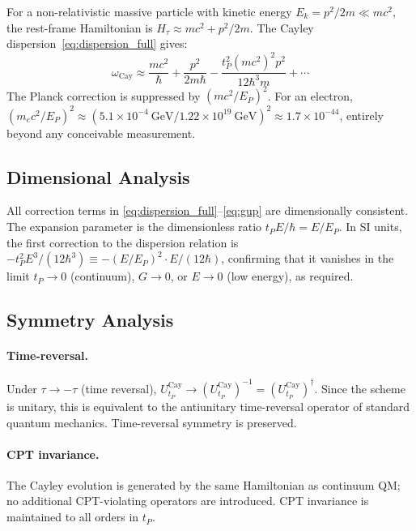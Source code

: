 \documentclass[12pt,a4paper]{article}
\begin{document}
For a non-relativistic massive particle with kinetic energy $E_k = p^2/2m \ll mc^2$,
the rest-frame Hamiltonian is $H_\tau \approx mc^2 + p^2/2m$.  The Cayley
dispersion~\eqref{eq:dispersion_full} gives:
\begin{equation}
  \omega_{\mathrm{Cay}} \approx \frac{mc^2}{\hbar}
  + \frac{p^2}{2m\hbar}
  - \frac{t_P^2 (mc^2)^2 p^2}{12\hbar^3 m} + \cdots
  \label{eq:nr_expansion}
\end{equation}
The Planck correction is suppressed by $(mc^2/E_P)^2$.  For an electron,
$(m_e c^2/E_P)^2 \approx (5.1 \times 10^{-4}~\text{GeV}/1.22 \times 10^{19}~\text{GeV})^2
\approx 1.7 \times 10^{-44}$, entirely beyond any conceivable measurement.

\subsection{Dimensional Analysis}
\label{sec:dimensional}

All correction terms in \eqref{eq:dispersion_full}--\eqref{eq:gup} are dimensionally
consistent.  The expansion parameter is the dimensionless ratio $t_P E/\hbar = E/E_P$.
In SI units, the first correction to the dispersion relation is
$-t_P^2 E^3/(12\hbar^3) \equiv -(E/E_P)^2 \cdot E/(12\hbar)$, confirming that it
vanishes in the limit $t_P \to 0$ (continuum), $G \to 0$, or $E \to 0$ (low energy), as
required.

\subsection{Symmetry Analysis}
\label{sec:symmetry}

\paragraph{Time-reversal.}
Under $\tau \to -\tau$ (time reversal), $U_{t_P}^{\mathrm{Cay}} \to (U_{t_P}^{\mathrm{Cay}})^{-1}
= (U_{t_P}^{\mathrm{Cay}})^\dagger$.  Since the scheme is unitary, this is equivalent to
the antiunitary time-reversal operator of standard quantum mechanics.  Time-reversal
symmetry is preserved.

\paragraph{CPT invariance.}
The Cayley evolution is generated by the same Hamiltonian as continuum QM; no additional
CPT-violating operators are introduced.  CPT invariance is maintained to all orders in
$t_P$.
\end{document}
